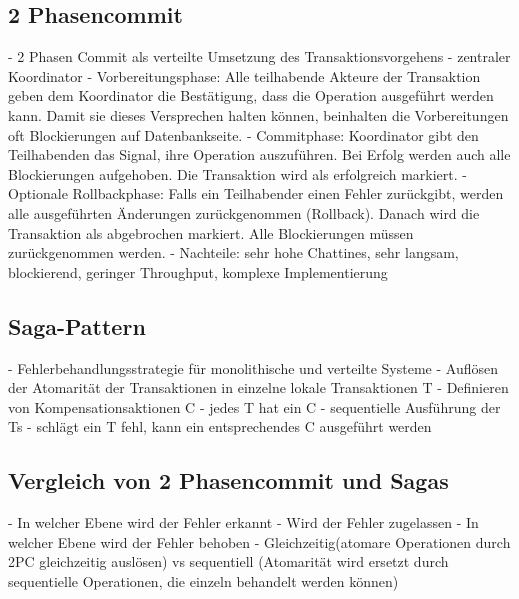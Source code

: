 \subsection{2 Phasencommit}
- 2 Phasen Commit als verteilte Umsetzung des Transaktionsvorgehens
- zentraler Koordinator
- Vorbereitungsphase: Alle teilhabende Akteure der Transaktion geben dem Koordinator die Bestätigung, dass die Operation ausgeführt werden kann. Damit sie dieses Versprechen halten können, beinhalten die Vorbereitungen oft Blockierungen auf Datenbankseite.
- Commitphase: Koordinator gibt den Teilhabenden das Signal, ihre Operation auszuführen. Bei Erfolg werden auch alle Blockierungen aufgehoben. Die Transaktion wird als erfolgreich markiert.
- Optionale Rollbackphase: Falls ein Teilhabender einen Fehler zurückgibt, werden alle ausgeführten Änderungen zurückgenommen (Rollback). Danach wird die Transaktion als abgebrochen markiert. Alle Blockierungen müssen zurückgenommen werden.
- Nachteile: sehr hohe Chattines, sehr langsam, blockierend, geringer Throughput, komplexe Implementierung

\subsection{Saga-Pattern}
- Fehlerbehandlungsstrategie für monolithische und verteilte Systeme
- Auflösen der Atomarität der Transaktionen in einzelne lokale Transaktionen T
- Definieren von Kompensationsaktionen C
- jedes T hat ein C
- sequentielle Ausführung der Ts
- schlägt ein T fehl, kann ein entsprechendes C ausgeführt werden

\subsection{Vergleich von 2 Phasencommit und Sagas}
- In welcher Ebene wird der Fehler erkannt
- Wird der Fehler zugelassen
- In welcher Ebene wird der Fehler behoben
- Gleichzeitig(atomare Operationen durch 2PC gleichzeitig auslösen) vs sequentiell (Atomarität wird ersetzt durch sequentielle Operationen, die einzeln behandelt werden können)